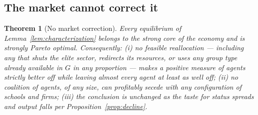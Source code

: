 \documentclass[12pt,letterpaper]{article}
\newtheorem{theorem}{Theorem}
\theoremstyle{definition}
\begin{document}
\subsection{The market cannot correct it}

\begin{theorem}[No market correction]\label{thm:nocorrection} Every equilibrium of Lemma~\ref{lem:characterization} belongs to the strong core of the economy and is strongly Pareto optimal.
Consequently: (i) no feasible reallocation --- including any that shuts the elite sector, redirects its resources, or uses any group type already available in $G$ in any proportion --- makes a positive measure of agents strictly better off while leaving almost every agent at least as well off; (ii) no coalition of agents, of any size, can profitably secede with any configuration of schools and firms; (iii) the conclusion is unchanged as the taste for status spreads and output falls per Proposition~\ref{prop:decline}.
\end{theorem}
\end{document}
